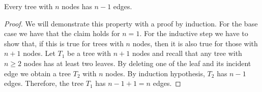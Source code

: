 \documentclass[12pt, a4paper]{report}
\begin{document}
    \begin{proposition}[Property]
        Every tree with $n$ nodes has $n-1$ edges. 
    \end{proposition}
    \begin{proof}
        We will demonstrate this property with a proof by induction. 
        For the base case we have that the claim holds for $n=1$. 
        For the inductive step we have to show that, if this is true for trees with $n$ nodes, then it is also true for those with $n+1$ nodes. 
        Let $T_1$ be a tree with $n+1$ nodes and recall that any tree with $n \geq 2$ nodes has at least two leaves. 
        By deleting one of the leaf and its incident edge we obtain a tree $T_2$ with $n$ nodes. 
        By induction hypothesis, $T_2$ has $n-1$ edges. 
        Therefore, the tree $T_1$ has $n-1+1=n$ edges. 
    \end{proof}





    
\end{document}
